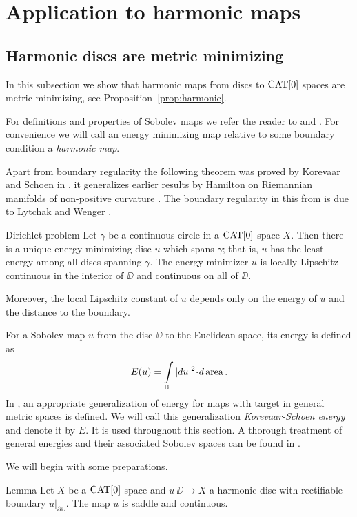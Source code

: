 \documentclass[a4paper,10pt]{amsart}
\begin{document}
\section{Application to harmonic maps}

\subsection{Harmonic discs are metric minimizing}

In this subsection we show that harmonic maps from discs to $\mathop{\rm CAT}\nolimits[0]$ spaces are metric minimizing, see Proposition~\ref{prop:harmonic}.

For definitions and properties of Sobolev maps we refer the reader to \cite{LW} and \cite{LW2}. For convenience we will call
an energy minimizing map relative to some boundary condition a {\em harmonic map}.


Apart from boundary regularity the following theorem was proved by Korevaar and Schoen in \cite{KS}, it generalizes earlier results by Hamilton on Riemannian manifolds of non-positive
curvature \cite{H}. The boundary regularity in this from is due to Lytchak and Wenger \cite{LW4}.

\begin{thm}{Dirichlet problem}\label{thm:dirichlet}
Let $\gamma$ be a continuous circle in a $\mathop{\rm CAT}\nolimits[0]$ space $X$. 
Then there is a unique energy minimizing disc $u$ which spans $\gamma$; 
that is, $u$
has the least energy among all discs spanning $\gamma$. 
The energy minimizer $u$ is locally Lipschitz continuous in the interior of $\DD$ and continuous on all of $\DD$.

Moreover, the local Lipschitz constant of $u$ depends only on the energy of $u$ and the distance to the boundary.
\end{thm}

For a Sobolev map $u$ from the disc $\DD$ to the Euclidean space, its energy is defined as 
\[E(u)=\int\limits_\DD|du|^2\cdot d\area.\]
In \cite{KS}, an appropriate generalization of energy for maps with target in general metric spaces is defined.
We will call this generalization {\em Korevaar-Schoen energy} and denote it by $E$. It is used throughout this section. 
A thorough treatment of general energies and their associated Sobolev
spaces can be found in \cite{LW2}.



We will begin with some preparations. 


\begin{thm}{Lemma}\label{lem:harmsaddle}
Let $X$ be a $\mathop{\rm CAT}\nolimits[0]$ space and
$u\:\DD\to X$ a harmonic disc with rectifiable boundary $u|_{\partial \DD}$.
The map $u$ is saddle and continuous.
\end{thm}
\end{document}
